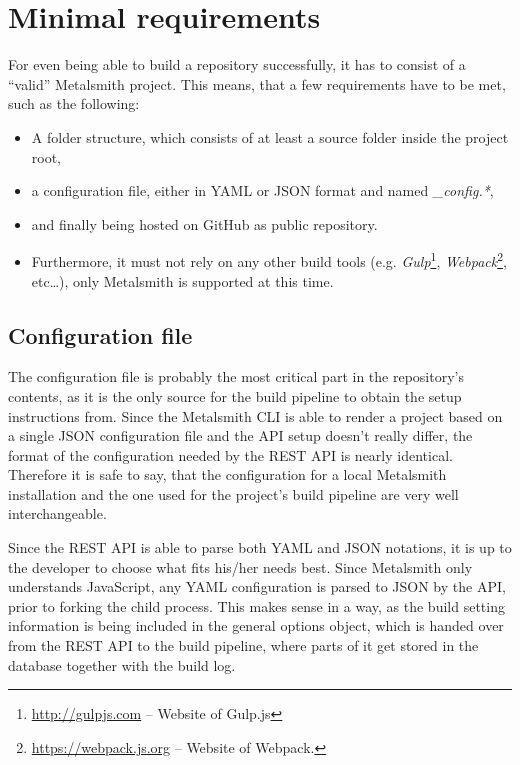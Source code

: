 \section{Minimal requirements}
\label{sec:minimalrequirements}

For even being able to build a repository successfully, it has to consist of a ``valid'' Metalsmith project. This means, that a few requirements have to be met, such as the following:

\begin{itemize}
  \item A folder structure, which consists of at least a source folder inside the project root,
  \item a configuration file, either in YAML or JSON format and named \emph{\_config.*},
  \item and finally being hosted on GitHub as public repository.
  \item Furthermore, it must not rely on any other build tools (e.g. \emph{Gulp}\footnote{\url{http://gulpjs.com} -- Website of Gulp.js}, \emph{Webpack}\footnote{\url{https://webpack.js.org} -- Website of Webpack.}, etc\ldots), only Metalsmith is supported at this time.
\end{itemize}

\subsection{Configuration file}
\label{sec:minimalrequirements-configuration}
The configuration file is probably the most critical part in the repository's contents, as it is the only source for the build pipeline to obtain the setup instructions from. Since the Metalsmith CLI is able to render a project based on a single JSON configuration file and the API setup doesn't really differ, the format of the configuration needed by the REST API is nearly identical. Therefore it is safe to say, that the configuration for a local Metalsmith installation and the one used for the project's build pipeline are very well interchangeable.



Since the REST API is able to parse both YAML and JSON notations, it is up to the developer to choose what fits his/her needs best. Since Metalsmith only understands JavaScript, any YAML configuration is parsed to JSON by the API, prior to forking the child process. This makes sense in a way, as the build setting information is being included in the general options object, which is handed over from the REST API to the build pipeline, where parts of it get stored in the database together with the build log.

